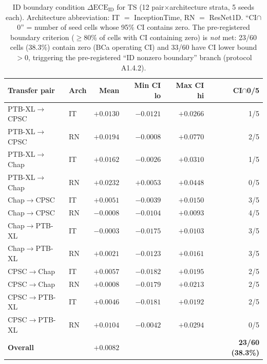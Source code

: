 \documentclass[review,12pt,nonatbib]{elsarticle}
\begin{document}
\begin{table}[t]
\centering
\caption{ID boundary condition $\Delta\text{ECE}_{\text{ID}}$ for TS
(12 pair$\times$architecture strata, 5 seeds each). Architecture
abbreviation: IT $=$ InceptionTime, RN $=$ ResNet1D. ``CI$\cap$0'' =
number of seed cells whose 95\% CI contains zero. The pre-registered
boundary criterion ($\geq$80\% of cells with CI containing zero) is
\emph{not} met: 23/60 cells (38.3\%) contain zero (BCa operating CI)
and 33/60 have CI lower bound $>0$, triggering the pre-registered
``ID nonzero boundary'' branch (protocol A1.4.2).}
\label{tab:boundary}
\footnotesize
\begin{tabular}{llrrrr}
\toprule
Transfer pair & Arch & Mean & Min CI lo & Max CI hi & CI$\cap$0/5 \\
\midrule
PTB-XL$\rightarrow$CPSC   & IT & $+0.0130$ & $-0.0121$ & $+0.0266$ & 1/5 \\
PTB-XL$\rightarrow$CPSC   & RN & $+0.0194$ & $-0.0008$ & $+0.0770$ & 2/5 \\
PTB-XL$\rightarrow$Chap   & IT & $+0.0162$ & $-0.0026$ & $+0.0310$ & 1/5 \\
PTB-XL$\rightarrow$Chap   & RN & $+0.0232$ & $+0.0053$ & $+0.0448$ & 0/5 \\
Chap$\rightarrow$CPSC     & IT & $+0.0051$ & $-0.0039$ & $+0.0150$ & 3/5 \\
Chap$\rightarrow$CPSC     & RN & $-0.0008$ & $-0.0104$ & $+0.0093$ & 4/5 \\
Chap$\rightarrow$PTB-XL   & IT & $-0.0003$ & $-0.0175$ & $+0.0103$ & 3/5 \\
Chap$\rightarrow$PTB-XL   & RN & $+0.0021$ & $-0.0123$ & $+0.0161$ & 3/5 \\
CPSC$\rightarrow$Chap     & IT & $+0.0057$ & $-0.0182$ & $+0.0195$ & 2/5 \\
CPSC$\rightarrow$Chap     & RN & $+0.0008$ & $-0.0179$ & $+0.0213$ & 2/5 \\
CPSC$\rightarrow$PTB-XL   & IT & $+0.0046$ & $-0.0181$ & $+0.0192$ & 2/5 \\
CPSC$\rightarrow$PTB-XL   & RN & $+0.0104$ & $-0.0042$ & $+0.0294$ & 0/5 \\
\midrule
\textbf{Overall} & & $\mathbf{+0.0082}$ & & & \textbf{23/60 (38.3\%)} \\
\bottomrule
\end{tabular}
\end{table}
\end{document}
